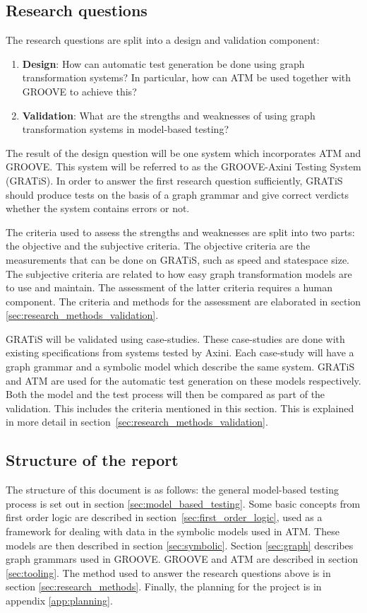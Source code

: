 \subsection{Research questions}\label{sec:questions}
The research questions are split into a design and validation component:
\begin{enumerate}
    \item \textbf{Design}: How can automatic test generation be done using graph transformation systems? In particular, how can ATM be used together with GROOVE to achieve this?
    \item \textbf{Validation}: What are the strengths and weaknesses of using graph transformation systems in model-based testing?
\end{enumerate}

The result of the design question will be one system which incorporates ATM and GROOVE. This system will be referred to as the GROOVE-Axini Testing System (GRATiS). In order to answer the first research question sufficiently, GRATiS should produce tests on the basis of a graph grammar and give correct verdicts whether the system contains errors or not.

The criteria used to assess the strengths and weaknesses are split into two parts: the objective and the subjective criteria. The objective criteria are the measurements that can be done on GRATiS, such as speed and statespace size. The subjective criteria are related to how easy graph transformation models are to use and maintain. The assessment of the latter criteria requires a human component. The criteria and methods for the assessment are elaborated in section \ref{sec:research_methods_validation}.

GRATiS will be validated using case-studies. These case-studies are done with existing specifications from systems tested by Axini. Each case-study will have a graph grammar and a symbolic model which describe the same system. GRATiS and ATM are used for the automatic test generation on these models respectively. Both the model and the test process will then be compared as part of the validation. This includes the criteria mentioned in this section. This is explained in more detail in section~\ref{sec:research_methods_validation}.

\subsection{Structure of the report}
The structure of this document is as follows: the general model-based testing process is set out in section \ref{sec:model_based_testing}. Some basic concepts from first order logic are described in section~\ref{sec:first_order_logic}, used as a framework for dealing with data in the symbolic models used in ATM. These models are then described in section \ref{sec:symbolic}. Section \ref{sec:graph} describes graph grammars used in GROOVE. GROOVE and ATM are described in section \ref{sec:tooling}. The method used to answer the research questions above is in section \ref{sec:research_methods}. Finally, the planning for the project is in appendix \ref{app:planning}.
